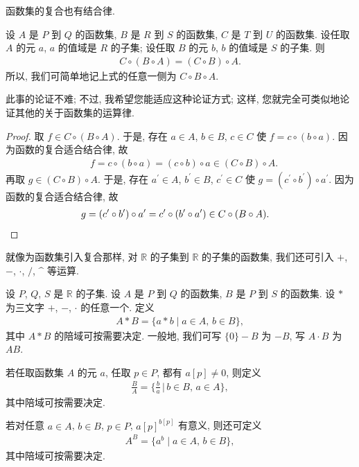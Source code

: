 函数集的复合也有结合律.

\begin{theorem}
    设 $A$ 是 $P$ 到 $Q$ 的函数集, $B$ 是 $R$ 到 $S$ 的函数集, $C$ 是 $T$ 到 $U$ 的函数集. 设任取 $A$ 的元 $a$, $a$ 的值域是 $R$ 的子集; 设任取 $B$ 的元 $b$, $b$ 的值域是 $S$ 的子集. 则
    \begin{align*}
        C \circ (B \circ A) = (C \circ B) \circ A.
    \end{align*}
    所以, 我们可简单地记上式的任意一侧为 $C \circ B \circ A$.
\end{theorem}

此事的论证不难; 不过, 我希望您能适应这种论证方式; 这样, 您就完全可类似地论证其他的关于函数集的运算律.

\begin{proof}
    取 $f \in C \circ (B \circ A)$. 于是, 存在 $a \in A$, $b \in B$, $c \in C$ 使 $f = c \circ (b \circ a)$. 因为函数的复合适合结合律, 故
    \begin{align*}
         & f = c \circ (b \circ a) = (c \circ b) \circ a \in (C \circ B) \circ A.
    \end{align*}
    再取 $g \in (C \circ B) \circ A$. 于是, 存在 $a^{\prime} \in A$, $b^{\prime} \in B$, $c^{\prime} \in C$ 使 $g = (c^{\prime} \circ b^{\prime}) \circ a^{\prime}$. 因为函数的复合适合结合律, 故
    \begin{align*}
         & g = (c^{\prime} \circ b^{\prime}) \circ a^{\prime} = c^{\prime} \circ (b^{\prime} \circ a^{\prime}) \in C \circ (B \circ A). \qedhere
    \end{align*}
\end{proof}

就像为函数集引入复合那样, 对 $\mathbb{R}$ 的子集到 $\mathbb{R}$ 的子集的函数集, 我们还可引入 $+$, $-$, $\cdot$, $/$, $\text{\textasciicircum}$ 等运算.

\begin{definition}
    设 $P$, $Q$, $S$ 是 $\mathbb{R}$ 的子集. 设 $A$ 是 $P$ 到 $Q$ 的函数集, $B$ 是 $P$ 到 $S$ 的函数集. 设 $\ast$ 为三文字 $+$, $-$, $\cdot$ 的任意一个. 定义
    \begin{align*}
        A \ast B = \{ a \ast b \mid \text{$a \in A$, $b \in B$} \},
    \end{align*}
    其中 $A \ast B$ 的陪域可按需要决定. 一般地, 我们可写 $\{ 0 \} - B$ 为 $-B$, 写 $A \cdot B$ 为 $AB$.

    若任取函数集 $A$ 的元 $a$, 任取 $p \in P$, 都有 $a[p] \neq 0$, 则定义
    \begin{align*}
        \frac{B}{A} = \Bigg\{ \frac{b}{a} \,\Bigg|\,  \text{$b \in B$, $a \in A$} \Bigg\},
    \end{align*}
    其中陪域可按需要决定.

    若对任意 $a \in A$, $b \in B$, $p \in P$, ${a[p]}^{b[p]}$ 有意义, 则还可定义
    \begin{align*}
        A^B = \{ a^b \mid \text{$a \in A$, $b \in B$} \},
    \end{align*}
    其中陪域可按需要决定.
\end{definition}

